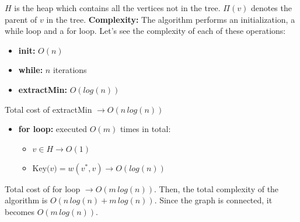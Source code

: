 $H$ is the heap which contains all the vertices not in the tree. $\Pi(v)$ denotes the parent of $v$ in the tree.\newline\newline %
\textbf{Complexity:}
The algorithm performs an initialization, a while loop and a for loop. Let's see the complexity of each of these operations:
\begin{itemize}
    \item \textbf{init:} $O(n)$
    \item \textbf{while:} $n$ iterations
    \item \textbf{extractMin:} $O(log(n))$
\end{itemize}
Total cost of extractMin $\rightarrow O(n\,log(n))$
\begin{itemize}
    \item \textbf{for loop:} executed $O(m)$ times in total:
    \begin{itemize}
        \item $v \in H \rightarrow O(1)$
        \item $\text{Key($v$)} = w(v^{*}, v) \rightarrow O(log(n))$
    \end{itemize}
\end{itemize}
Total cost of for loop $\rightarrow O(m\,log(n))$. \newline\newline
Then, the total complexity of the algorithm is $O(n\,log(n) + m\,log(n))$. Since the graph is connected, it becomes $O(m\,log(n))$.

